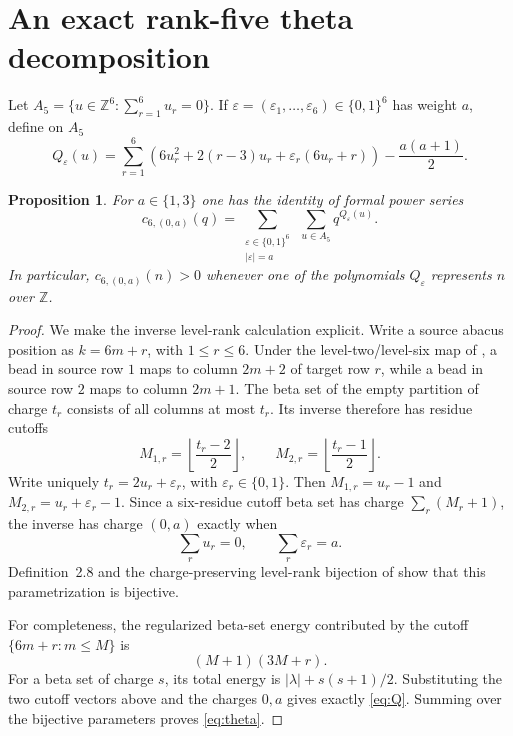 \documentclass[11pt]{article}
\newtheorem{proposition}[theorem]{Proposition}
\theoremstyle{remark}
\newcommand{\Z}{\mathbb Z}
\begin{document}
\section{An exact rank-five theta decomposition}

Let $A_5=\{u\in\Z^6:\sum_{r=1}^6u_r=0\}$.  If
$\varepsilon=(\varepsilon_1,\ldots,\varepsilon_6)\in\{0,1\}^6$ has weight
$a$, define on $A_5$
\begin{equation}\label{eq:Q}
 Q_\varepsilon(u)=
 \sum_{r=1}^6\left(6u_r^2+2(r-3)u_r
       +\varepsilon_r(6u_r+r)\right)-\frac{a(a+1)}2.
\end{equation}

\begin{proposition}\label{prop:theta}
For $a\in\{1,3\}$ one has the identity of formal power series
\begin{equation}\label{eq:theta}
 c_{6,(0,a)}(q)=
 \sum_{\substack{\varepsilon\in\{0,1\}^6\\ |\varepsilon|=a}}
 \ \sum_{u\in A_5}q^{Q_\varepsilon(u)}.
\end{equation}
In particular, $c_{6,(0,a)}(n)>0$ whenever one of the polynomials
$Q_\varepsilon$ represents $n$ over $\Z$.
\end{proposition}

\begin{proof}
We make the inverse level-rank calculation explicit.  Write a source abacus
position as $k=6m+r$, with $1\leq r\leq6$.  Under the level-two/level-six
map of \cite[Section~2.2]{GerberNorton2026}, a bead in source row $1$ maps
to column $2m+2$ of target row $r$, while a bead in source row $2$ maps to
column $2m+1$.  The beta set of the empty partition of charge $t_r$ consists
of all columns at most $t_r$.  Its inverse therefore has residue cutoffs
\[
 M_{1,r}=\left\lfloor\frac{t_r-2}{2}\right\rfloor,
 \qquad
 M_{2,r}=\left\lfloor\frac{t_r-1}{2}\right\rfloor.
\]
Write uniquely $t_r=2u_r+\varepsilon_r$, with
$\varepsilon_r\in\{0,1\}$.  Then $M_{1,r}=u_r-1$ and
$M_{2,r}=u_r+\varepsilon_r-1$.  Since a six-residue cutoff beta set has
charge $\sum_r(M_r+1)$, the inverse has charge $(0,a)$ exactly when
\[
 \sum_ru_r=0,\qquad \sum_r\varepsilon_r=a.
\]
Definition~2.8 and the charge-preserving level-rank bijection of
\cite{GerberNorton2026} show that this parametrization is bijective.

For completeness, the regularized beta-set energy contributed by the cutoff
$\{6m+r:m\leq M\}$ is
\[
 (M+1)(3M+r).
\]
For a beta set of charge $s$, its total energy is
$|\lambda|+s(s+1)/2$.  Substituting the two cutoff vectors above and the
charges $0,a$ gives exactly \eqref{eq:Q}.  Summing over the bijective
parameters proves \eqref{eq:theta}.
\end{proof}
\end{document}
